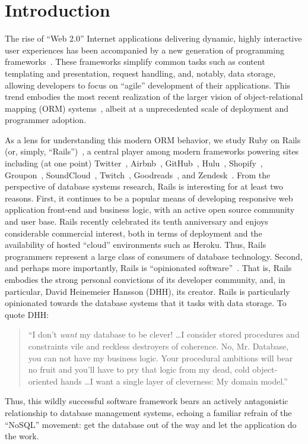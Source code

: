 
\section{Introduction}
\label{sec:intro}

The rise of ``Web 2.0'' Internet applications delivering dynamic,
highly interactive user experiences has been accompanied by a new
generation of programming frameworks~\cite{web20}. These frameworks
simplify common tasks such as content templating and presentation,
request handling, and, notably, data storage, allowing developers to
focus on ``agile'' development of their applications. This trend
embodies the most recent realization of the larger vision of
object-relational mapping (ORM) systems~\cite{orm-db}, albeit at a
unprecedented scale of deployment and programmer adoption.

As a lens for understanding this modern ORM behavior, we study Ruby on
Rails (or, simply, ``Rails'')~\cite{rails-book,rails-computer}, a
central player among modern frameworks powering sites including (at
one point) Twitter~\cite{twitter-rails}, Airbnb~\cite{airbnb-rails},
GitHub~\cite{github-rails}, Hulu~\cite{hulu-rails},
Shopify~\cite{shopify-rails}, Groupon~\cite{groupon-rails},
SoundCloud~\cite{soundcloud-rails}, Twitch~\cite{twitch-rails},
Goodreads~\cite{goodreads-rails}, and
Zendesk~\cite{zendesk-rails}. From the perspective of database systems
research, Rails is interesting for at least two reasons. First, it
continues to be a popular means of developing responsive web
application front-end and business logic, with an active open source
community and user base. Rails recently celebrated its tenth
anniversary and enjoys considerable commercial interest, both in terms
of deployment and the availability of hosted ``cloud'' 
environments such as Heroku. Thus, Rails programmers represent a large
class of consumers of database technology. Second, and perhaps more
importantly, Rails is ``opinionated
software''~\cite{dhh-opinionated}. That is, Rails embodies the strong
personal convictions of its developer community, and, in particular,
David Heinemeier Hansson (DHH), its creator. Rails is particularly
opinionated towards the database systems that it tasks with data
storage. To quote DHH:
\begin{quote}
``I don't \textit{want} my database to be clever! \dots I consider stored procedures and constraints vile and reckless destroyers of coherence. No, Mr. Database, you can not have my business logic. Your procedural ambitions will bear no fruit and you'll have to pry that logic from my dead, cold object-oriented hands \dots I want a single layer of cleverness: My domain model.''~\cite{dhh-clever}
\end{quote}
Thus, this wildly successful software framework bears an actively
antagonistic relationship to database management systems, echoing a familiar refrain of the ``NoSQL'' movement: get the database out of the way and let the application do the work.

